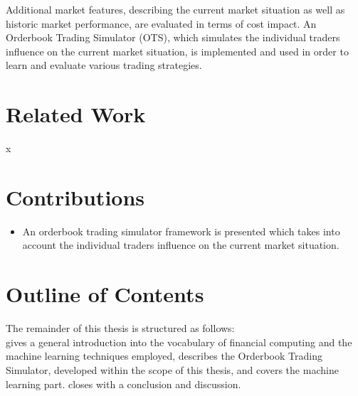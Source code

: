 Additional market features, describing the current market situation as well as historic market performance, are evaluated in terms of cost impact. An Orderbook Trading Simulator (OTS), which simulates the individual traders influence on the current market situation, is implemented and used in order to learn and evaluate various trading strategies.


\section{Related Work}
\label{sec:relatedwork}
x

\section{Contributions}
\label{sec:contributions}
\begin{itemize}
\item An orderbook trading simulator framework is presented which takes into account the individual traders influence on the current market situation.

\end{itemize}

\section{Outline of Contents}
\label{sec:outline}
The remainder of this thesis is structured as follows:\\
 gives a general introduction into the vocabulary of financial computing and the machine learning techniques employed,  describes the Orderbook Trading  Simulator, developed within the scope of this thesis, and  covers the machine learning part.  closes with a conclusion and discussion.


\cleardoublepage{}
